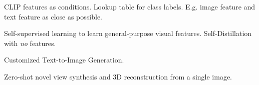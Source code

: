 \begin{definition}[CLIP]
    CLIP features as conditions. Lookup table for class labels. E.g. image feature and text feature as close as possible.
\end{definition}

\begin{definition}[DINOv2]
    Self-supervised learning to learn general-purpose visual features. Self-Distillation with \textit{no} features.
\end{definition}

\begin{definition}[DreamBooth]
    Customized Text-to-Image Generation.
\end{definition}

\begin{definition}[Zero-1-to-3]
    Zero-shot novel view synthesis and 3D reconstruction from a single image.
\end{definition}